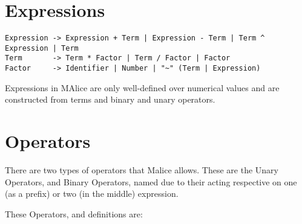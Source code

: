 \documentclass[a4wide, 11pt]{article}
\begin{document}
\section{Expressions}

\begin{verbatim}
Expression -> Expression + Term | Expression - Term | Term ^ Expression | Term
Term       -> Term * Factor | Term / Factor | Factor
Factor     -> Identifier | Number | "~" (Term | Expression)

\end{verbatim}

Expressions in MAlice are only well-defined over numerical values and are constructed from terms and binary and unary operators.

\section{Operators}

There are two types of operators that Malice allows. These are the Unary Operators, and Binary Operators, named due to their acting respective on one (as a prefix) or two (in the middle) expression.

These Operators, and definitions are:
\end{document}
